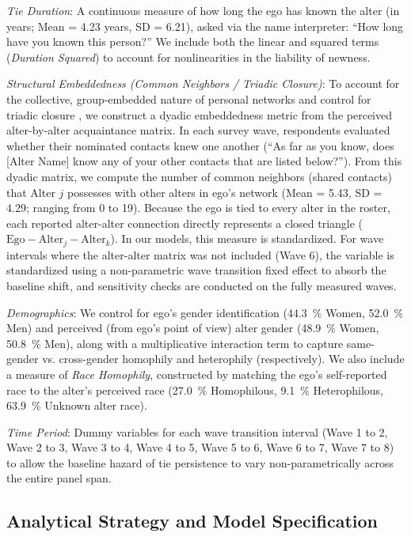 \documentclass[
  letterpaper,
  DIV=11,
  numbers=noendperiod]{scrartcl}
\def\percent{\%}%
\begin{document}
\emph{Tie Duration}: A continuous measure of how long the ego has known the alter (in years; Mean = 4.23 years, SD = 6.21), asked via the name interpreter: ``How long have you known this person?'' We include both the linear and squared terms (\emph{Duration Squared}) to account for nonlinearities in the liability of newness.

\emph{Structural Embeddedness (Common Neighbors / Triadic Closure)}: To account for the collective, group-embedded nature of personal networks and control for triadic closure \citep{granovetter1973strength-f5f, coleman1988}, we construct a dyadic embeddedness metric from the perceived alter-by-alter acquaintance matrix. In each survey wave, respondents evaluated whether their nominated contacts knew one another (``As far as you know, does [Alter Name] know any of your other contacts that are listed below?''). From this dyadic matrix, we compute the number of common neighbors (shared contacts) that Alter $j$ possesses with other alters in ego's network (Mean = 5.43, SD = 4.29; ranging from 0 to 19). Because the ego is tied to every alter in the roster, each reported alter-alter connection directly represents a closed triangle ($\text{Ego} - \text{Alter}_j - \text{Alter}_k$). In our models, this measure is standardized. For wave intervals where the alter-alter matrix was not included (Wave 6), the variable is standardized using a non-parametric wave transition fixed effect to absorb the baseline shift, and sensitivity checks are conducted on the fully measured waves.

\emph{Demographics}: We control for ego's gender identification (\SI{44.3}{\percent} Women, \SI{52.0}{\percent} Men) and perceived (from ego's point of view) alter gender (\SI{48.9}{\percent} Women, \SI{50.8}{\percent} Men), along with a multiplicative interaction term to capture same-gender vs. cross-gender homophily and heterophily (respectively). We also include a measure of \emph{Race Homophily}, constructed by matching the ego's self-reported race to the alter's perceived race (\SI{27.0}{\percent} Homophilous, \SI{9.1}{\percent} Heterophilous, \SI{63.9}{\percent} Unknown alter race).

\emph{Time Period}: Dummy variables for each wave transition interval (Wave 1 to 2, Wave 2 to 3, Wave 3 to 4, Wave 4 to 5, Wave 5 to 6, Wave 6 to 7, Wave 7 to 8) to allow the baseline hazard of tie persistence to vary non-parametrically across the entire panel span.

\subsection{Analytical Strategy and Model Specification}\label{analytical-strategy}
\end{document}
